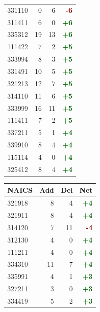 \documentclass[11pt]{article}
\begin{document}
\begin{table}[H]
\begin{minipage}{0.48\textwidth}
\begin{tabular}{lrrr}
331110 & 0 & 6 & \textcolor{darkred}{\textbf{-6}} \\
311411 & 6 & 0 & \textcolor{darkgreen}{\textbf{+6}} \\
335312 & 19 & 13 & \textcolor{darkgreen}{\textbf{+6}} \\
111422 & 7 & 2 & \textcolor{darkgreen}{\textbf{+5}} \\
333994 & 8 & 3 & \textcolor{darkgreen}{\textbf{+5}} \\
331491 & 10 & 5 & \textcolor{darkgreen}{\textbf{+5}} \\
321213 & 12 & 7 & \textcolor{darkgreen}{\textbf{+5}} \\
314110 & 11 & 6 & \textcolor{darkgreen}{\textbf{+5}} \\
333999 & 16 & 11 & \textcolor{darkgreen}{\textbf{+5}} \\
111411 & 7 & 2 & \textcolor{darkgreen}{\textbf{+5}} \\
337211 & 5 & 1 & \textcolor{darkgreen}{\textbf{+4}} \\
339910 & 8 & 4 & \textcolor{darkgreen}{\textbf{+4}} \\
115114 & 4 & 0 & \textcolor{darkgreen}{\textbf{+4}} \\
325412 & 8 & 4 & \textcolor{darkgreen}{\textbf{+4}} \\
\bottomrule
\end{tabular}
\end{minipage}
\hfill
\begin{minipage}{0.48\textwidth}
\centering
{}
\begin{tabular}{lrrr}
\toprule
\textbf{NAICS} & \textbf{Add} & \textbf{Del} & \textbf{Net} \\
\midrule
321918 & 8 & 4 & \textcolor{darkgreen}{\textbf{+4}} \\
321911 & 8 & 4 & \textcolor{darkgreen}{\textbf{+4}} \\
314120 & 7 & 11 & \textcolor{darkred}{\textbf{-4}} \\
312130 & 4 & 0 & \textcolor{darkgreen}{\textbf{+4}} \\
111211 & 4 & 0 & \textcolor{darkgreen}{\textbf{+4}} \\
334310 & 11 & 7 & \textcolor{darkgreen}{\textbf{+4}} \\
335991 & 4 & 1 & \textcolor{darkgreen}{\textbf{+3}} \\
327211 & 3 & 0 & \textcolor{darkgreen}{\textbf{+3}} \\
334419 & 5 & 2 & \textcolor{darkgreen}{\textbf{+3}} \\

\end{tabular}
\end{minipage}
\end{table}
\end{document}
